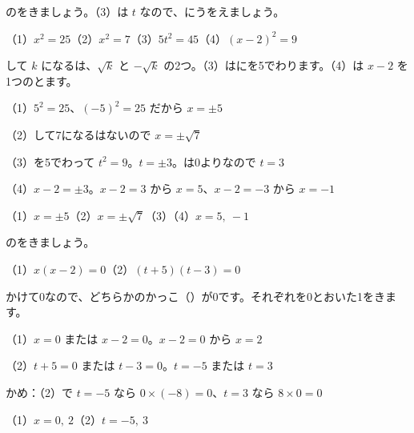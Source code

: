 
\begin{reidai}[$x^2=k$ の\R{形}{かたち}の\R{方程式}{ほう|てい|しき}]
のをきましょう。（3）は $t$ なので、にうをえましょう。\par
（1）\nobreak $x^2=25$\quad（2）\nobreak $x^2=7$\quad（3）\nobreak $5t^2=45$\quad（4）\nobreak $(x-2)^2=9$\par
{}して $k$ になるは、$\sqrt{k}$ と $-\sqrt{k}$ の2つ。（3）はにを5でわります。（4）は $x-2$ を1つのとます。\par
\shiki（1）\nobreak $5^2=25$、$(-5)^2=25$ だから $x=\pm5$\par
\hspace*{2.6\zw}（2）して7になるはないので $x=\pm\sqrt{7}$\par
\hspace*{2.6\zw}（3）\nobreak {}を5でわって $t^2=9$。$t=\pm3$。は0よりなので $t=3$\par
\hspace*{2.6\zw}（4）\nobreak $x-2=\pm3$。$x-2=3$ から $x=5$、$x-2=-3$ から $x=-1$\par
\kotae（1）\nobreak $x=\pm5$\quad（2）\nobreak $x=\pm\sqrt{7}$\quad（3）\quad（4）\nobreak $x=5,\ -1$
\end{reidai}

\begin{reidai}
のをきましょう。\par（1）\nobreak $x(x-2)=0$\quad（2）\nobreak $(t+5)(t-3)=0$\par
\kangaekata かけて0なので、どちらかのかっこ（）が0です。それぞれを0とおいた1をきます。\par
\shiki（1）\nobreak $x=0$ または $x-2=0$。$x-2=0$ から $x=2$\par
\hspace*{2.6\zw}（2）\nobreak $t+5=0$ または $t-3=0$。$t=-5$ または $t=3$\par
\hspace*{2.6\zw}かめ：（2）\nobreak で $t=-5$ なら $0\times(-8)=0$、$t=3$ なら $8\times0=0$\par
\kotae（1）\nobreak $x=0,\ 2$\quad（2）\nobreak $t=-5,\ 3$
\end{reidai}

